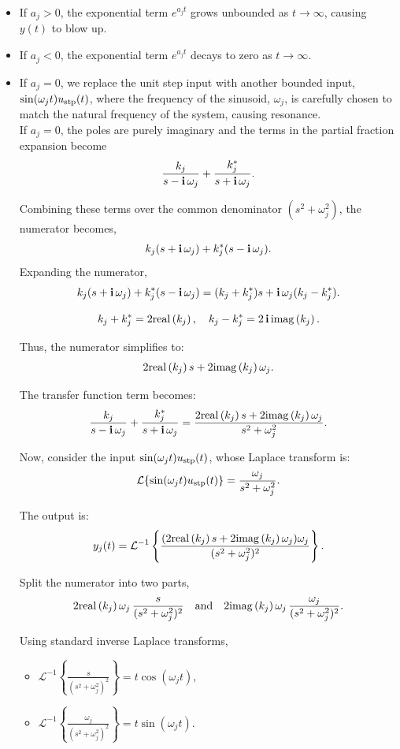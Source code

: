 \begin{itemize}
    \item If \(a_j > 0\), the exponential term \(e^{a_j t}\) grows unbounded as \(t \to \infty\), causing \(y(t)\) to blow up.
 \item If \(a_j < 0\),  the exponential term \(e^{a_j t}\) decays to zero as \(t \to \infty\).
\item If $a_j=0$,  we replace the unit step input with another bounded input, $\sin(\omega_j t) u_{\rm stp}(t)$, where the frequency of the sinusoid, $\omega_j$, is carefully chosen to match the natural frequency of the system, causing resonance. \\


If \(a_j = 0\), the poles are purely imaginary and the terms in the partial fraction expansion become
\[
\frac{k_j}{s - \mathop{\bm{\mathrm i}} \omega_j} + \frac{k_j^\ast}{s + \mathop{\bm{\mathrm i}} \omega_j}.
\]

Combining these terms over the common denominator \((s^2 + \omega_j^2)\), the numerator becomes,
\[
k_j (s + \mathop{\bm{\mathrm i}} \omega_j) + k_j^\ast (s - \mathop{\bm{\mathrm i}} \omega_j).
\]
Expanding the numerator,
\[
k_j (s + \mathop{\bm{\mathrm i}} \omega_j) + k_j^\ast (s - \mathop{\bm{\mathrm i}} \omega_j) = (k_j + k_j^\ast)s + \mathop{\bm{\mathrm i}} \omega_j (k_j - k_j^\ast).
\]

\[
k_j + k_j^\ast = 2 \mathrm{real} \left( k_j \right), \quad k_j - k_j^\ast = 2 \mathop{\bm{\mathrm i}} \mathrm{imag} \left( k_j \right).
\]

Thus, the numerator simplifies to:
\[
2 \mathrm{real} \left( k_j \right) s + 2 \mathrm{imag} \left( k_j \right) \omega_j.
\]

The transfer function term becomes:
\[
\frac{k_j}{s - \mathop{\bm{\mathrm i}} \omega_j} + \frac{k_j^\ast}{s + \mathop{\bm{\mathrm i}} \omega_j} = \frac{2 \mathrm{real} \left( k_j \right) s + 2 \mathrm{imag} \left( k_j \right) \omega_j}{s^2 + \omega_j^2}.
\]

Now, consider the input \(\sin(\omega_j t) u_{\rm stp}(t)\), whose Laplace transform is:
\[
\mathcal{L}\{\sin(\omega_j t) u_{\rm stp}(t)\} = \frac{\omega_j}{s^2 + \omega_j^2}.
\]

The output is:
\[
y_j(t) = \mathcal{L}^{-1} \left\{ \frac{(2 \mathrm{real} \left( k_j \right) s + 2 \mathrm{imag} \left( k_j \right) \omega_j) \omega_j}{(s^2 + \omega_j^2)^2} \right\}.
\]


Split the numerator into two parts,
\[
2 \mathrm{real} \left( k_j \right) \omega_j \, \frac{ s}{(s^2 + \omega_j^2)^2} \quad \text{and} \quad 2 \mathrm{imag} \left( k_j \right) \omega_j \, \frac{\omega_j}{(s^2 + \omega_j^2)^2}.
\]

Using standard inverse Laplace transforms,
\begin{itemize}
    \item \(\mathcal{L}^{-1} \left\{ \frac{s}{(s^2 + \omega_j^2)^2} \right\} = t \cos(\omega_j t),\)
    \item \(\mathcal{L}^{-1} \left\{ \frac{\omega_j}{(s^2 + \omega_j^2)^2} \right\} = t \sin(\omega_j t).\)
\end{itemize}


\end{itemize}
